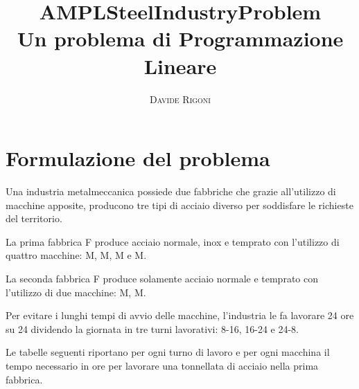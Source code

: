\documentclass[12pt]{article} %
\title{\Huge \textbf{AMPLSteelIndustryProblem} \\ \Huge Un problema di Programmazione Lineare }
\author{\textsc{Davide Rigoni}}
\begin{document}
\maketitle
\newpage

\tableofcontents %
\listoftables

\newpage

\section{Formulazione del problema}
Una industria metalmeccanica possiede due fabbriche che grazie all'utilizzo di macchine apposite, producono tre tipi di acciaio diverso per soddisfare le richieste del territorio.

La prima fabbrica F produce acciaio normale, inox e temprato con l'utilizzo di quattro  macchine: M, M, M e M.

La seconda fabbrica F produce solamente acciaio normale e temprato con l'utilizzo di due macchine: M, M.

Per evitare i lunghi tempi di avvio delle macchine, l'industria le fa lavorare 24 ore su 24 dividendo la giornata in tre turni lavorativi: 8-16, 16-24 e 24-8. 

Le tabelle seguenti riportano per ogni turno di lavoro e per ogni macchina il tempo necessario in ore per lavorare una tonnellata di acciaio nella prima fabbrica.
\end{document}
